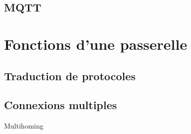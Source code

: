 \lipsum


\subsection{MQTT} %
\label{sub:mqtt}

\lipsum



\section{Fonctions d'une passerelle} %
\label{sec:fonctions_d_une_passerelle}

\subsection{Traduction de protocoles} %
\label{sub:traduction_de_protocoles}

\lipsum


\subsection{Connexions multiples} %
\label{sub:connexions_multiples}

Multihoming



